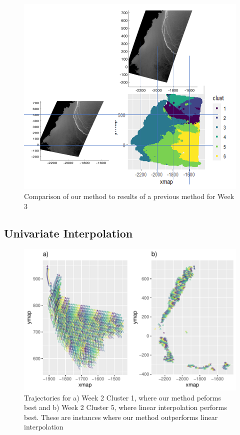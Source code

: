 \documentclass[12pt]{article}
\begin{document}
\begin{figure}[tbp]

{\centering \includegraphics[width=0.8\linewidth,]{images/week-comp} 

}

\caption{Comparison of our method to results of a previous method for Week 3}\label{fig:week-comp}
\end{figure}

\hypertarget{univariate-interpolation-1}{%
\subsection{Univariate Interpolation}\label{univariate-interpolation-1}}

\begin{figure}[tbp]

{\centering \includegraphics[width=\linewidth,]{spatio-temporal-model-arctic-sea-ice_files/figure-latex/int-best-plots-1} 

}

\caption{Trajectories for a) Week 2 Cluster 1, where our method peforms best and b) Week 2 Cluster 5, where linear interpolation performs best. These are instances where our method outperforms linear interpolation}\label{fig:int-best-plots}
\end{figure}
\end{document}

